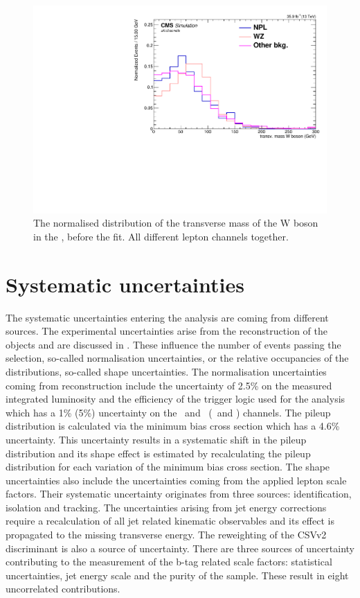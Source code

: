 \begin{figure}[htbp]
	\centering
	\includegraphics[width=0.49\linewidth]{6_Search/Figures/MTWnormalised/MTW_all_Normalized}
	\caption{The normalised distribution of the transverse mass of the W boson in the \WZCR, before the fit. All different lepton channels together. }
	\label{fig:mtwallnorm}
\end{figure}


\section{Systematic uncertainties}
The systematic uncertainties entering the analysis are coming from different sources. The experimental uncertainties arise from the reconstruction of the objects and are discussed in . These influence the number of events passing the selection, so-called normalisation uncertainties, or the relative occupancies of the distributions, so-called shape
 uncertainties. The normalisation uncertainties coming from reconstruction include the uncertainty of 2.5\% on the measured integrated luminosity and the efficiency of the trigger logic used for the analysis which has a 1\% (5\%) uncertainty on the 
 \mumumu\ and \emumu\ (\eemu\ and \eee) channels. The  pileup distribution is calculated via the minimum bias cross section which has a 4.6\% uncertainty. This uncertainty results in a systematic shift in the pileup distribution and its shape effect is estimated by recalculating the pileup distribution for each variation of the minimum bias cross section. The shape uncertainties also include the uncertainties coming from the applied lepton scale factors. Their systematic uncertainty originates from three sources: identification, isolation and tracking.  The uncertainties arising from jet energy corrections require a recalculation of all jet related kinematic observables and its effect is propagated to the missing transverse energy.  The reweighting of the CSVv2 discriminant is also a source of uncertainty. There are three sources of uncertainty contributing to the measurement of the b-tag related scale factors: statistical uncertainties, jet energy scale and the purity of the sample. These result in eight uncorrelated contributions. 
 
